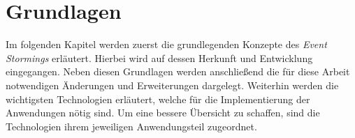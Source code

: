 \chapter{Grundlagen}\label{ch:grundlagen}
Im folgenden Kapitel werden zuerst die grundlegenden Konzepte des \textit{Event Stormings} erläutert.
Hierbei wird auf dessen Herkunft und Entwicklung eingegangen.
Neben diesen Grundlagen werden anschließend die für diese Arbeit notwendigen Änderungen und Erweiterungen dargelegt.
Weiterhin werden die wichtigsten Technologien erläutert, welche für die Implementierung der Anwendungen nötig sind.
Um eine bessere Übersicht zu schaffen, sind die Technologien ihrem jeweiligen Anwendungsteil zugeordnet.




